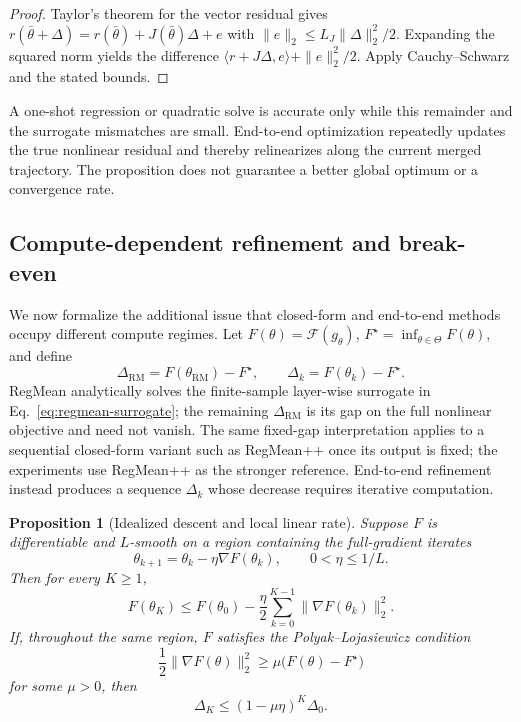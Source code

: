 \documentclass[letterpaper]{article} %
\theoremstyle{plain}
\newtheorem{proposition}[theorem]{Proposition}
\theoremstyle{definition}
\begin{document}
\begin{proof}
Taylor's theorem for the vector residual gives $r(\bar\theta+\Delta)=r(\bar\theta)+J(\bar\theta)\Delta+e$ with $\|e\|_2\le L_J\|\Delta\|_2^2/2$.
Expanding the squared norm yields the difference $\langle r+J\Delta,e\rangle+\|e\|_2^2/2$.
Apply Cauchy--Schwarz and the stated bounds.
\end{proof}

A one-shot regression or quadratic solve is accurate only while this remainder and the surrogate mismatches are small.
End-to-end optimization repeatedly updates the true nonlinear residual and thereby relinearizes along the current merged trajectory.
The proposition does not guarantee a better global optimum or a convergence rate.

\subsection{Compute-dependent refinement and break-even}
\label{app:compute-error}

We now formalize the additional issue that closed-form and end-to-end methods occupy different compute regimes.
Let $F(\theta)=\mathcal F(g_\theta)$, $F^\star=\inf_{\theta\in\Theta}F(\theta)$, and define
\begin{equation}
\Delta_{\mathrm{RM}}=F(\theta_{\mathrm{RM}})-F^\star,
\qquad
\Delta_k=F(\theta_k)-F^\star.
\label{eq:formal-gaps}
\end{equation}
RegMean analytically solves the finite-sample layer-wise surrogate in Eq.~\eqref{eq:regmean-surrogate}; the remaining $\Delta_{\mathrm{RM}}$ is its gap on the full nonlinear objective and need not vanish.
The same fixed-gap interpretation applies to a sequential closed-form variant such as RegMean++ once its output is fixed; the experiments use RegMean++ as the stronger reference.
End-to-end refinement instead produces a sequence $\Delta_k$ whose decrease requires iterative computation.

\begin{proposition}[Idealized descent and local linear rate]
\label{prop:compute-error-formal}
Suppose $F$ is differentiable and $L$-smooth on a region containing the full-gradient iterates
\begin{equation}
\theta_{k+1}=\theta_k-\eta\nabla F(\theta_k),
\qquad 0<\eta\le 1/L.
\label{eq:idealized-gd}
\end{equation}
Then for every $K\ge1$,
\begin{equation}
F(\theta_K)
\le
F(\theta_0)-\frac{\eta}{2}
\sum_{k=0}^{K-1}\|\nabla F(\theta_k)\|_2^2.
\label{eq:formal-descent}
\end{equation}
If, throughout the same region, $F$ satisfies the Polyak--Lojasiewicz condition
\begin{equation}
\frac12\|\nabla F(\theta)\|_2^2
\ge \mu\bigl(F(\theta)-F^\star\bigr)
\label{eq:pl-condition}
\end{equation}
for some $\mu>0$, then
\begin{equation}
\Delta_K\le(1-\mu\eta)^K\Delta_0.
\label{eq:formal-linear-rate}
\end{equation}
\end{proposition}
\end{document}
